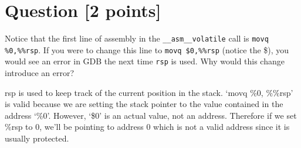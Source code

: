\documentclass[11pt]{article}
\begin{document}
\section{Question [2 points]}

Notice that the first line of assembly in the \texttt{\_\_asm\_\_volatile\(\)} 
call is \texttt{movq \%0,\%\%rsp}. If you were to change this line to \texttt{movq \$0,\%\%rsp} 
(notice the \$), you would see an error in GDB the next time \texttt{rsp} is used. 
Why would this change introduce an error?

\begin{solution}
rsp is used to keep track of the current position in the stack. `movq \%0, \%\%rsp' is valid 
because we are setting the stack pointer to the value contained in the address `\%0'. 
However, `\$0' is an actual value, not an address. Therefore if we set \%rsp to 0, 
we'll be pointing to address 0 which is not a valid address since it is usually protected. 
\end{solution}
\end{document}
